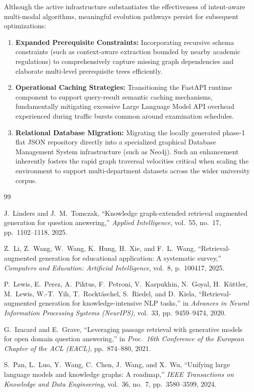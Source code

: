 \documentclass[12pt,a4paper]{report}
\begin{document}
Although the active infrastructure substantiates the effectiveness of intent-aware multi-modal algorithms, meaningful evolution pathways persist for subsequent optimizations:
\begin{enumerate}
    \item \textbf{Expanded Prerequisite Constraints:} Incorporating recursive schema constraints (such as context-aware extraction bounded by nearby academic regulations) to comprehensively capture missing graph dependencies and elaborate multi-level prerequisite trees efficiently.
    \item \textbf{Operational Caching Strategies:} Transitioning the FastAPI runtime component to support query-result semantic caching mechanisms, fundamentally mitigating excessive Large Language Model API overhead experienced during traffic bursts common around examination schedules.
    \item \textbf{Relational Database Migration:} Migrating the locally generated phase-1 flat JSON repository directly into a specialized graphical Database Management System infrastructure (such as Neo4j). Such an enhancement inherently fosters the rapid graph traversal velocities critical when scaling the environment to support multi-department datasets across the wider university corpus.
\end{enumerate}

\clearpage


\begin{thebibliography}{99}

  J.~Linders and J.~M.~Tomczak,
  ``Knowledge graph-extended retrieval augmented generation for question answering,''
  \emph{Applied Intelligence}, vol.~55, no.~17, pp.~1102--1118, 2025.

  Z.~Li, Z.~Wang, W.~Wang, K.~Hung, H.~Xie, and F.~L.~Wang,
  ``Retrieval-augmented generation for educational application: A systematic survey,''
  \emph{Computers and Education: Artificial Intelligence}, vol.~8, p.~100417, 2025.

  P.~Lewis, E.~Perez, A.~Piktus, F.~Petroni, V.~Karpukhin, N.~Goyal,
  H.~K\"{u}ttler, M.~Lewis, W.-T.~Yih, T.~Rockt\"{a}schel, S.~Riedel, and D.~Kiela,
  ``Retrieval-augmented generation for knowledge-intensive NLP tasks,''
  in \emph{Advances in Neural Information Processing Systems (NeurIPS)}, vol.~33,
  pp.~9459--9474, 2020.

  G.~Izacard and E.~Grave,
  ``Leveraging passage retrieval with generative models for open domain question answering,''
  in \emph{Proc.\ 16th Conference of the European Chapter of the ACL (EACL)},
  pp.~874--880, 2021.

  S.~Pan, L.~Luo, Y.~Wang, C.~Chen, J.~Wang, and X.~Wu,
  ``Unifying large language models and knowledge graphs: A roadmap,''
  \emph{IEEE Transactions on Knowledge and Data Engineering}, vol.~36, no.~7,
  pp.~3580--3599, 2024.

\end{thebibliography}
\end{document}
